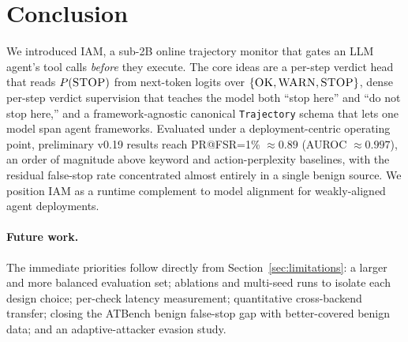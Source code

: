 \section{Conclusion}
\label{sec:conclusion}

We introduced IAM, a sub-2B online trajectory monitor that gates an LLM
agent's tool calls \emph{before} they execute. The core ideas are a per-step
verdict head that reads $P(\textsc{STOP})$ from next-token logits over
$\{\textsc{OK},\textsc{WARN},\textsc{STOP}\}$, dense per-step verdict
supervision that teaches the model both ``stop here'' and ``do not stop here,''
and a framework-agnostic canonical \texttt{Trajectory} schema that lets one
model span agent frameworks. Evaluated under a deployment-centric operating
point, preliminary v0.19 results reach PR@FSR=1\% $\approx 0.89$ (AUROC
$\approx 0.997$), an order of magnitude above keyword and action-perplexity
baselines, with the residual false-stop rate concentrated almost entirely in a
single benign source. We position IAM as a runtime complement to model
alignment for weakly-aligned agent deployments.

\paragraph{Future work.}
The immediate priorities follow directly from Section~\ref{sec:limitations}: a
larger and more balanced evaluation set; ablations and multi-seed runs to
isolate each design choice; per-check latency measurement; quantitative
cross-backend transfer; closing the ATBench benign false-stop gap with
better-covered benign data; and an adaptive-attacker evasion study.
